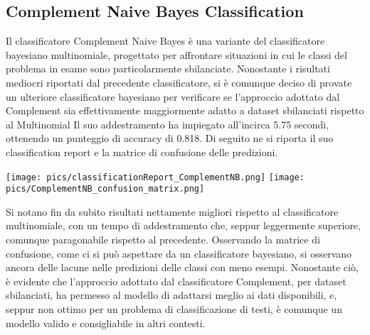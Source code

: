 \documentclass[12pt,oneside]{article}
\begin{document}
     \begin{enumerate}
    \subsection{Complement Naive Bayes Classification}
    \begin{justify}
        Il classificatore Complement Naive Bayes è una variante del classificatore bayesiano multinomiale, progettato per affrontare situazioni in cui le classi del problema in esame sono particolarmente sbilanciate. Nonostante i risultati mediocri riportati dal precedente classificatore, si è comunque deciso di provate un ulteriore classificatore bayesiano per verificare se l’approccio adottato dal Complement sia effettivamente maggiormente adatto a dataset sbilanciati rispetto al Multinomial
    Il suo addestramento ha impiegato all’incirca 5.75 secondi, ottenendo un punteggio di accuracy di 0.818. Di seguito ne si riporta il suo classification report e la matrice di confusione delle predizioni.
    \end{justify}

    \texttt{[image: pics/classificationReport\_ComplementNB.png]}
    \texttt{[image: pics/ComplementNB\_confusion\_matrix.png]}

    \begin{justify}
    Si notano fin da subito risultati nettamente migliori rispetto al classificatore multinomiale, con un tempo di addestramento che, seppur leggermente superiore, comunque paragonabile rispetto al precedente. Osservando la matrice di confusione, come ci si può aspettare da un classificatore bayesiano, si osservano ancora delle lacune nelle predizioni delle classi con meno esempi. Nonostante ciò, è evidente che l’approccio adottato dal classificatore Complement, per dataset sbilanciati, ha permesso al modello di adattarsi meglio ai dati disponibili, e, seppur non ottimo per un problema di classificazione di testi, è comunque un modello valido e consigliabile in altri contesti.
    \end{justify}
    \end{enumerate}
    
\end{document}
